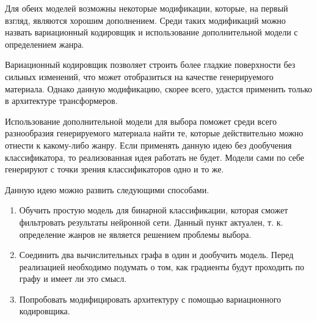 Для обеих моделей возможны некоторые модификации, которые, на первый взгляд, являются хорошим дополнением. Среди таких модификаций можно назвать вариационный кодировщик и использование дополнительной модели с определением жанра.

Вариационный кодировщик позволяет строить более гладкие поверхности без сильных изменений, что может отобразиться на качестве генерируемого материала. Однако данную модификацию, скорее всего, удастся применить только в архитектуре трансформеров.

Использование дополнительной модели для выбора поможет среди всего разнообразия генерируемого материала найти те, которые действительно можно отнести к какому-либо жанру. Если применять данную идею без дообучения классификатора, то реализованная идея работать не будет. Модели сами по себе генерируют с точки зрения классификаторов одно и то же.

Данную идею можно развить следующими способами.
\begin{enumerate}
    \item Обучить простую модель для бинарной классификации, которая сможет фильтровать результаты нейронной сети. Данный пункт актуален, т. к. определение жанров не является решением проблемы выбора.
    \item Соединить два вычислительных графа в один и дообучить модель. Перед реализацией необходимо подумать о том, как градиенты будут проходить по графу и имеет ли это смысл.
    \item Попробовать модифицировать архитектуру с помощью вариационного кодировщика.
\end{enumerate}
